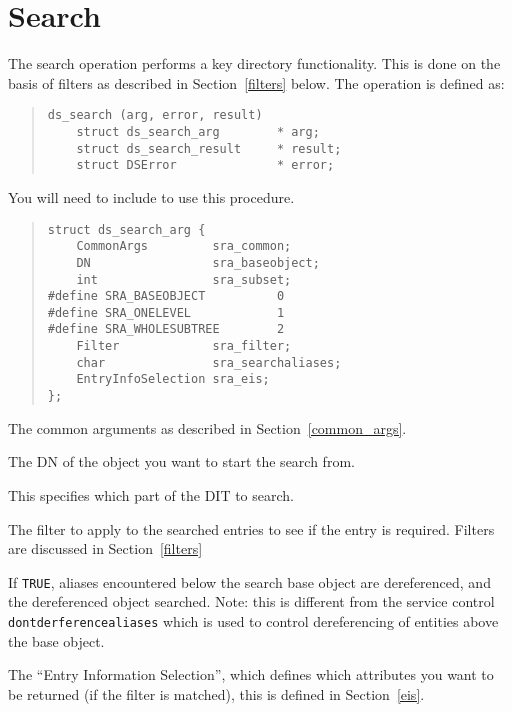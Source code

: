 \section {Search}
\label{proc_search}
The search operation performs a key directory functionality.  This is done on
the basis of 
filters as described in Section~\ref{filters} below.
The operation is defined as:
\begin{quote}\small\begin{verbatim}
ds_search (arg, error, result)
    struct ds_search_arg        * arg;    
    struct ds_search_result     * result;
    struct DSError              * error;
\end{verbatim}\end{quote}

You will need to include  to use this procedure.

\begin{quote}\small\begin{verbatim}
struct ds_search_arg {
    CommonArgs         sra_common;
    DN                 sra_baseobject;
    int                sra_subset;
#define SRA_BASEOBJECT          0
#define SRA_ONELEVEL            1
#define SRA_WHOLESUBTREE        2
    Filter             sra_filter;
    char               sra_searchaliases;
    EntryInfoSelection sra_eis;
};
\end{verbatim}\end{quote}

\begin{describe}
\item [\verb"sra\_common":] The common arguments as described in
Section~\ref{common_args}.
\item [\verb"sra\_baseobject":] The DN of the object you want to start the
search from.
\item [\verb"sra\_subset":] This specifies which part of the DIT to search.
\item [\verb"sra\_filter":] The filter to apply to the searched entries to
see if the entry is required.  Filters are discussed in Section~\ref{filters}
\item [\verb"sra\_searchaliases":] If \verb+TRUE+, aliases encountered below
the search base object are dereferenced, and the dereferenced object searched. 
Note: this is different from the service control
\verb+dontderferencealiases+ which is used to control dereferencing of
entities above the base object.
\item [\verb"sra\_eis":] The ``Entry Information Selection'', which defines
which attributes you want to be returned (if the filter is matched), 
this is defined in Section~\ref{eis}.
\end{describe}

